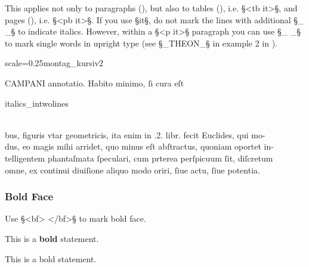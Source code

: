 \begin{clarification}
This applies not only to paragraphs (), but also to tables (), i.e. §<tb it>§, and pages (), i.e. §<pb it>§. If you use §it§, do not mark the lines with additional §_ _§ to indicate italics. However, within a §<p it>§ paragraph you can use §_ _§ to mark single words in upright type (see §_THEON_§ in example 2 in ).
\end{clarification}

\begin{sampleImageSmall}{scale=0.25}{montag_kursiv2}
\begin{typeLatin}
CAMPANI \bold{_}annotatio\bold{_}. Habito minimo, ſi cura eſt
\end{typeLatin}
\end{sampleImageSmall}

\begin{sampleImage}{italics_intwolines}
\begin{typeLatin}
 \someText\\
bus, figuris vtar geometricis, ita enim in .2. libr. fecit Euclides, qui mo-\\
dus, eo magis mihi arridet, quo minus eſt abſtractus, \bold{_}quoniam oportet in-\bold{_}\\
\bold{_}telligentem phantaſmata ſpeculari\bold{_}, cum prterea perſpicuum ſit, diſcretum\\
omne, ex continui diuiſione aliquo modo oriri, ſiue actu, ſiue potentia.\\
\someText {}
\end{typeLatin}
\end{sampleImage}


\subsubsection{Bold Face}
\label{section bold face}

\begin{mainruleLessImportant}
Use §<bf> </bf>§ to mark bold face.
\end{mainruleLessImportant}

\begin{example}

\vspace{-4mm}
This is a \textbf{bold}  statement.

\begin{typeLatin}
This is a bold statement.
\end{typeLatin}
\end{example}

